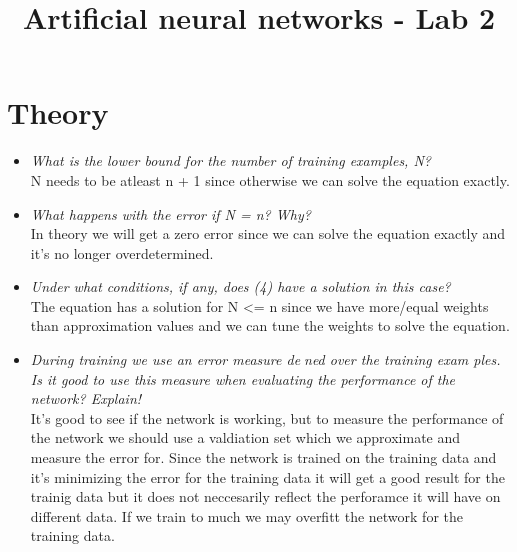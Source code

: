 \documentclass[a4paper,11pt]{article}
\title{\textbf{\huge{Artificial neural networks - Lab 2}}}
\begin{document}
\maketitle

\section{Theory}

\begin{itemize}

\item \textit{What is the lower bound for the number of training examples, N?} \\
N needs to be atleast n + 1 since otherwise we can solve the equation exactly.

\item \textit{What happens with the error if N = n? Why?} \\
In theory we will get a zero error since we can solve the equation exactly and it's no longer overdetermined.

\item \textit{Under what conditions, if any, does (4) have a solution in this case?}  \\
The equation has a solution for N <= n since we have more/equal weights than approximation values and we can tune the weights to solve the equation.

\item \textit{During training we use an error measure dened over the training exam ples. Is it good to use this measure when evaluating the performance of the network? Explain!} \\
It's good to see if the network is working, but to measure the performance of the network we should use a valdiation set which we approximate and measure the error for. Since the network is trained on the training data and it's minimizing the error for the training data it will get a good result for the trainig data but it does not neccesarily reflect the perforamce it will have on different data. If we train to much we may overfitt the network for the training data.
\end{itemize}
\end{document}
